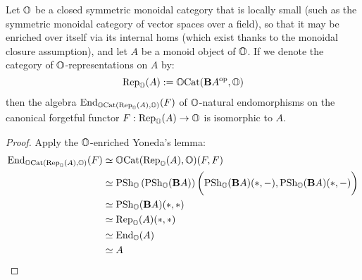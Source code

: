             \begin{lemma} \label{lemma: tannaka_duality}
                Let $\mathbb{O}$ be a closed symmetric monoidal category that is locally small (such as the symmetric monoidal category of vector spaces over a field), so that it may be enriched over itself via its internal homs (which exist thanks to the monoidal closure assumption), and let $A$ be a monoid object of $\mathbb{O}$. If we denote the category of $\mathbb{O}$-representations on $A$ by:
                    $$\mathrm{Rep}_{\mathbb{O}}(A) := \mathbb{O}\mathrm{Cat}(\mathbf{B} A^{\mathrm{op}}, \mathbb{O})$$
                then the algebra $\mathrm{End}_{\mathbb{O}\mathrm{Cat}(\mathrm{Rep}_{\mathbb{O}}(A), \mathbb{O})}(F)$ of $\mathbb{O}$-natural endomorphisms on the canonical forgetful functor $F: \mathrm{Rep}_{\mathbb{O}}(A) \to \mathbb{O}$ is isomorphic to $A$.
            \end{lemma}
                \begin{proof}
                    Apply the $\mathbb{O}$-enriched Yoneda's lemma:
                        $$
                            \begin{aligned}
                                \mathrm{End}_{\mathbb{O}\mathrm{Cat}(\mathrm{Rep}_{\mathbb{O}}(A), \mathbb{O})}(F) & \simeq \mathbb{O}\mathrm{Cat}(\mathrm{Rep}_{\mathbb{O}}(A), \mathbb{O})(F, F)
                                \\
                                & \simeq \mathrm{PSh}_{\mathbb{O}}\left(\mathrm{PSh}_{\mathbb{O}}(\mathbf{B} A)\right)\bigg(\mathrm{PSh}_{\mathbb{O}}(\mathbf{B} A)(*, -), \mathrm{PSh}_{\mathbb{O}}(\mathbf{B} A)(*, -)\bigg)
                                \\
                                & \simeq \mathrm{PSh}_{\mathbb{O}}(\mathbf{B} A)(*, *)
                                \\
                                & \simeq \mathrm{Rep}_{\mathbb{O}}(A)(*, *)
                                \\
                                & \simeq \mathrm{End}_{\mathbb{O}}(A)
                                \\
                                & \simeq A
                            \end{aligned}
                        $$
                \end{proof}
